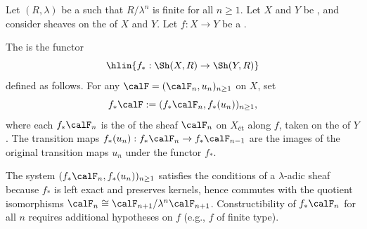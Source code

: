 \begin{definition} \label{definition:direct_image_functor_on_lambda_adic_sheaves_with_integral_coefficients_on_a_noetherian_scheme}
Let $(R, \lambda)$ be a   such that $R/\lambda^n$ is finite for all $n \geq 1$. Let $X$ and $Y$ be , and consider sheaves on the  of $X$ and $Y$. Let $f: X \to Y$ be a .

The  is the functor
$$\hlin{f_* : \Sh(X, R) \to \Sh(Y, R)}$$
defined as follows. For any  $\calF = (\calF_n, u_n)_{n \geq 1}$ on $X$, set
$$f_* \calF := (f_* \calF_n, f_*(u_n))_{n \geq 1},$$
where each $f_* \calF_n$ is the  of the sheaf $\calF_n$ on $X_{\text{\'et}}$ along $f$, taken on the  of $Y$. The transition maps $f_*(u_n): f_* \calF_n \to f_* \calF_{n-1}$ are the images of the original transition maps $u_n$ under the functor $f_*$.

The system $(f_* \calF_n, f_*(u_n))_{n \geq 1}$ satisfies the conditions of a $\lambda$-adic sheaf because $f_*$ is left exact and preserves kernels, hence commutes with the quotient isomorphisms $\calF_n \cong \calF_{n+1}/\lambda^n \calF_{n+1}$. Constructibility of $f_* \calF_n$ for all $n$ requires additional hypotheses on $f$ (e.g., $f$ of finite type).
\end{definition}
